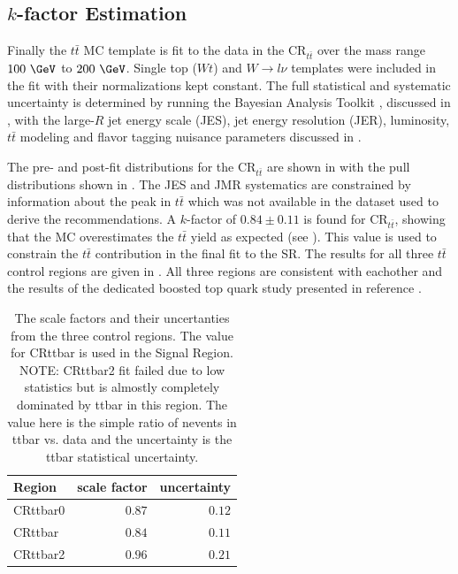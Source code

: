 \subsection{$k$-factor Estimation}

Finally the $t\bar{t}$ MC template is fit to the data in the
$\text{CR}_{t\bar{t}}$ over the mass range $100~\GeV$ to $200~\GeV$.  Single
top ($Wt$) and $W \rightarrow l\nu$ templates were included in the fit with
their normalizations kept constant. The full statistical and systematic
uncertainty is determined by running the Bayesian Analysis Toolkit
\cite{Beaujean:2011zz}, discussed in , with the large-$R$ jet
energy scale (JES), jet energy resolution (JER), luminosity, $t\bar{t}$
modeling and flavor tagging nuisance parameters discussed in
.

The pre- and post-fit distributions for the $\text{CR}_{t\bar{t}}$ are shown in
 with the pull distributions shown in
.  The JES and JMR systematics are constrained
by information about the peak in $t\bar{t}$ which was not available in the
dataset used to derive the recommendations. A $k$-factor of $0.84 \pm 0.11$ is
found for $\text{CR}_{t\bar{t}}$, showing that the MC overestimates the
$t\bar{t}$ yield as expected (see ). This
value is used to constrain the $t\bar{t}$ contribution in the final fit to the
SR. The results for all three $t\bar{t}$ control regions are given in
.  All three regions are consistent with eachother
and the results of the dedicated boosted top quark study presented in reference
\cite{ATLAS:2016jct}.

\begin{table}
  \centering
  \caption{The \ttbar scale factors and their uncertanties from the three \ttbar
control regions. The value for CRttbar is used in the Signal Region. NOTE:
CRttbar2 fit failed due to low statistics but is almostly completely dominated
by ttbar in this region.  The value here is the simple ratio of nevents in ttbar
vs. data and the uncertainty is the ttbar statistical uncertainty.}
  \begin{tabular}{@{}lrr@{}}
    \toprule
    Region & scale factor & uncertainty \\
    \midrule
    CRttbar0 & $0.87$ & $0.12$ \\
    CRttbar  & $0.84$ & $0.11$ \\
    CRttbar2 & $0.96$ & $0.21$ \\
    \bottomrule
  \end{tabular}
  \label{table:ttbar_kfactors}
\end{table}

